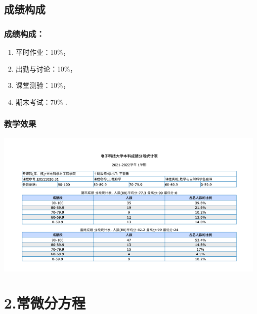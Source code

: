 \subsection{成绩构成}
\begin{frame}
	\frametitle{成绩构成：}
		\begin{enumerate}
		\item 平时作业：10\%，
		\vspace{0.8cm}
		\item 出勤与讨论：10\%，
		\vspace{0.8cm}
		\item 课堂测验：10\%，
		\vspace{0.8cm}
		\item 期末考试：70\% .
		\end{enumerate}	
\end{frame}

\begin{frame} [t]
    \frametitle{教学效果}
    \centering
    \includegraphics[width=1.0\textwidth]{figs/exam1.png}
\end{frame}

\section{2.常微分方程}
